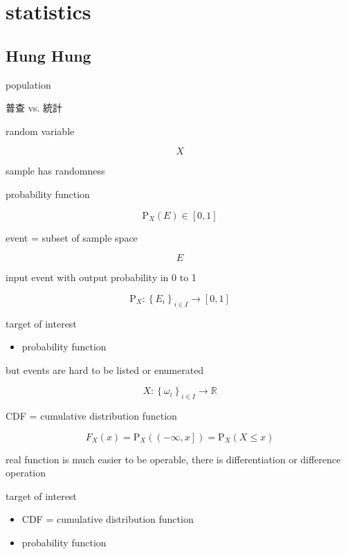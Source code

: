 \documentclass[
]{book}
\providecommand{\tightlist}{%
  \setlength{\itemsep}{0pt}\setlength{\parskip}{0pt}}
\theoremstyle{definition}
\theoremstyle{definition}
\theoremstyle{definition}
\theoremstyle{definition}
\theoremstyle{remark}
\begin{document}
\hypertarget{statistics}{%
\chapter{statistics}\label{statistics}}

\hypertarget{hung-hung}{%
\section{Hung Hung}\label{hung-hung}}

population

\begin{CJK}{UTF8}{bsmi}
普查 vs. 統計
\end{CJK}

random variable

\[
X
\]

sample has randomness

probability function

\[
\mathrm{P}_{{\scriptscriptstyle X}}\left(E\right)\in\left[0,1\right]
\]

event = subset of sample space

\[
E
\]

input event with output probability in 0 to 1

\[
\mathrm{P}_{{\scriptscriptstyle X}}:\left\{ E_{{\scriptscriptstyle i}}\right\} _{{\scriptscriptstyle i\in I}}\rightarrow\left[0,1\right]
\]

target of interest

\begin{itemize}
\tightlist
\item
  probability function
\end{itemize}

but events are hard to be listed or enumerated

\[
X:\left\{ \omega_{{\scriptscriptstyle i}}\right\} _{{\scriptscriptstyle i}\in I}\rightarrow\mathbb{R}
\]

CDF = cumulative distribution function

\[
F_{{\scriptscriptstyle X}}\left(x\right)=\mathrm{P}_{{\scriptscriptstyle X}}\left(\left(-\infty,x\right]\right)=\mathrm{P}_{{\scriptscriptstyle X}}\left(X\le x\right)
\]

real function is much easier to be operable, there is differentiation or difference operation

target of interest

\begin{itemize}
\tightlist
\item
  CDF = cumulative distribution function
\item
  probability function
\end{itemize}
\end{document}
